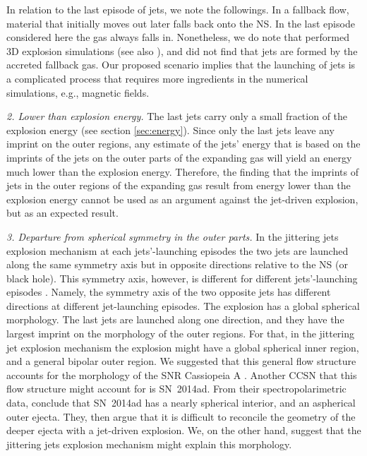 \documentclass[12pt,preprint,a4paper]{aastex}
\begin{document}
 In relation to the last episode of jets, we note the followings. In a fallback flow, material that initially moves out later falls back onto the NS. In the last episode considered here the gas always falls in. Nonetheless, we do note that \cite{Utrobinetal2015} performed 3D explosion simulations (see also \citealt{Rantsiouetal2011}), and did not find that jets are formed by the accreted fallback gas. Our proposed scenario implies that the launching of jets is a complicated process that requires more ingredients in the numerical simulations, e.g., magnetic fields.  
 
\textit{2. Lower than explosion energy.} The last jets carry only a small fraction of the explosion energy (see section \ref{sec:energy}). Since only the last jets leave any imprint on the outer regions, any estimate of the jets' energy that is based on the imprints of the jets on the outer parts of the expanding gas will yield an energy much lower than the explosion energy. Therefore, the finding that the imprints of jets in the outer regions of the expanding gas result from energy lower than the explosion energy cannot be used as an argument against the jet-driven explosion, but as an expected result. 

\textit{3. Departure from spherical symmetry in the outer parts.} In the jittering jets explosion mechanism at each jets'-launching episodes the two jets are launched along the same symmetry axis but in opposite directions relative to the NS (or black hole). This symmetry axis, however, is different for different jets'-launching episodes \citep{PapishSoker2011}. Namely, the symmetry axis of the two opposite jets has different directions at different jet-launching episodes. 
The explosion has a global spherical morphology. The last jets are launched along one direction, and they have the largest imprint on the morphology of the outer regions. For that, in the jittering jet explosion mechanism the explosion might have a global spherical inner region, and a general bipolar outer region. We suggested that this general flow structure accounts for the morphology of the SNR Cassiopeia A \citep{Gilkisetal2016, Soker2017c}. Another CCSN that this flow structure might account for is SN~2014ad. 
From their spectropolarimetric data, \cite{Stevanceetal2017} conclude that SN~2014ad has a nearly spherical interior, and an aspherical outer ejecta. 
They, then argue that it is difficult to reconcile the geometry of the deeper ejecta with a jet-driven explosion. We, on the other hand, suggest that the jittering jets explosion mechanism might explain this morphology. 
 
\end{document}
